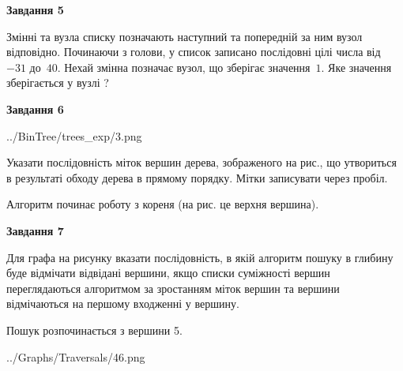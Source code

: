 \documentclass[12pt, ukrainian]{article}
\begin{document}
{\begin {large}
{\begin {center}\textbf{Завдання 5}\end {center}}\par
Змінні  та  вузла списку позначають наступний та попередній за ним вузол відповідно. Починаючи з голови, у список записано послідовні цілі числа від~$-31$ до~$40$. Нехай змінна  позначає вузол, що зберігає значення~$1$.
Яке значення зберігається у вузлі  ?\par
\newpage

{\begin {center}\textbf{Завдання 6}\end {center}}\par

\begin{center}
	{../BinTree/trees_exp/3.png}
\end{center}
Указати послідовність міток вершин дерева, зображеного на рис., що утвориться в результаті обходу дерева в прямому порядку. Мітки записувати через пробіл.\par Алгоритм починає роботу з кореня (на рис. це верхня вершина).\par
\newpage

{\begin {center}\textbf{Завдання 7}\end {center}}\par
Для графа на рисунку вказати послідовність, в якій алгоритм пошуку в глибину буде відмічати відвідані вершини, якщо списки суміжності вершин переглядаються алгоритмом за зростанням міток вершин та вершини відмічаються на першому вход\-женні у вершину.\par
Пошук розпочинається з вершини 5.\par

\begin{center}
	{../Graphs/Traversals/46.png}
\end{center}\par
\newpage


\end{large}}
\end{document}
